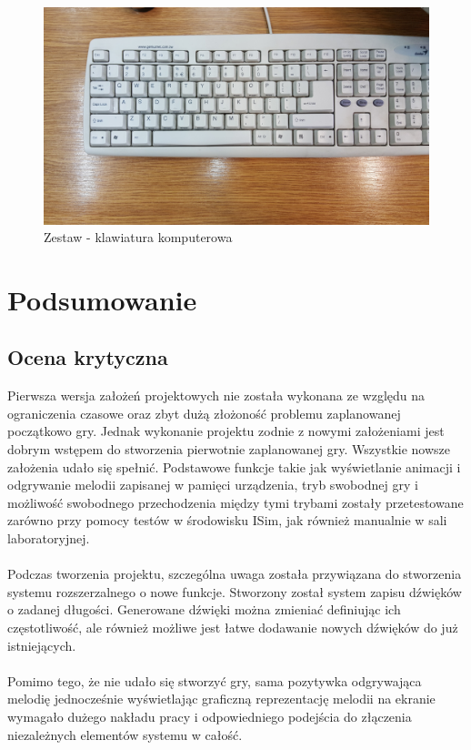 \documentclass[a4paper]{report}
\begin{document}
	\begin{figure}[h!]
				\centering
				\includegraphics[width=1.0\textwidth]{zestaw_klawiatura.jpg}
				\caption{Zestaw - klawiatura komputerowa}
	\end{figure}	
		
	
\chapter{Podsumowanie}
	\section{Ocena krytyczna}
	Pierwsza wersja założeń projektowych nie została wykonana ze względu na ograniczenia czasowe oraz zbyt dużą złożoność problemu zaplanowanej początkowo gry. Jednak wykonanie projektu zodnie z nowymi założeniami jest dobrym wstępem do stworzenia pierwotnie zaplanowanej gry. Wszystkie nowsze założenia udało się spełnić. Podstawowe funkcje takie jak wyświetlanie animacji i odgrywanie melodii zapisanej w pamięci urządzenia, tryb swobodnej gry i możliwość swobodnego przechodzenia między tymi trybami zostały przetestowane zarówno przy pomocy testów w środowisku ISim, jak również manualnie w sali laboratoryjnej.
\\\\Podczas tworzenia projektu, szczególna uwaga została przywiązana do stworzenia systemu rozszerzalnego o nowe funkcje. Stworzony został system zapisu dźwięków o zadanej długości. Generowane dźwięki można zmieniać definiując ich częstotliwość, ale również możliwe jest łatwe dodawanie nowych dźwięków do już istniejących.
\\\\Pomimo tego, że nie udało się stworzyć gry, sama pozytywka odgrywająca melodię jednocześnie wyświetlając graficzną reprezentację melodii na ekranie wymagało dużego nakładu pracy i odpowiedniego podejścia do złączenia niezależnych elementów systemu w całość.
\end{document}
